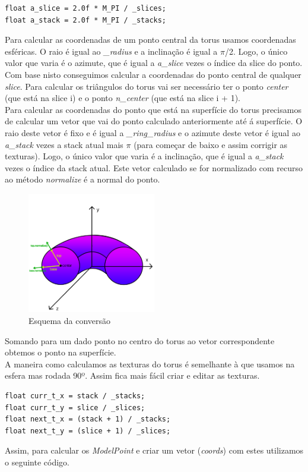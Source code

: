 \documentclass[a4paper]{report}
\begin{document}
\begin{lstlisting}
float a_slice = 2.0f * M_PI / _slices;
float a_stack = 2.0f * M_PI / _stacks;
\end{lstlisting}
Para calcular as coordenadas de um ponto central da torus usamos coordenadas
esféricas. O raio é igual ao \textit{\_radius} e a inclinação é igual a $\pi$/2.
Logo, o único valor que varia é o azimute, que é igual a \textit{a\_slice} vezes
o índice da slice do ponto.\\
Com base nisto conseguimos calcular a coordenadas do ponto central de qualquer
\textit{slice}. Para calcular os triângulos do torus vai ser necessário ter o
ponto \textit{center} (que está na slice i) e o ponto \textit{n\_center} (que
está na slice i + 1).\\
Para calcular as coordenadas do ponto que está na superfície do torus precisamos
de calcular um vetor que vai do ponto calculado anteriormente até á
superfície. O raio deste vetor é fixo e é igual a \textit{\_ring\_radius} e o
azimute deste vetor é igual ao \textit{a\_stack} vezes a stack atual mais $\pi$
(para começar de baixo e assim corrigir as texturas). Logo, o único valor que
varia é a inclinação, que é igual a \textit{a\_stack} vezes o índice da stack
atual. Este vetor calculado se for normalizado com recurso ao método
\textit{normalize} é a normal do ponto.\\
\begin{figure}[H]
    \centering 
    \includegraphics[width=0.5\textwidth]{images/torus_normal.png}
    \caption{Esquema da conversão}
\end{figure}
Somando para um dado ponto no centro do torus ao vetor correspondente obtemos o
ponto na superfície.\\
A maneira como calculamos as texturas do torus é semelhante à que usamos na
esfera  mas rodada 90º. Assim fica mais fácil criar e editar as texturas.\\
\begin{lstlisting}
float curr_t_x = stack / _stacks;
float curr_t_y = slice / _slices;
float next_t_x = (stack + 1) / _stacks;
float next_t_y = (slice + 1) / _slices;
\end{lstlisting}
Assim, para calcular os \textit{ModelPoint} e criar um vetor (\textit{coords})
com estes utilizamos o seguinte código.
\end{document}
